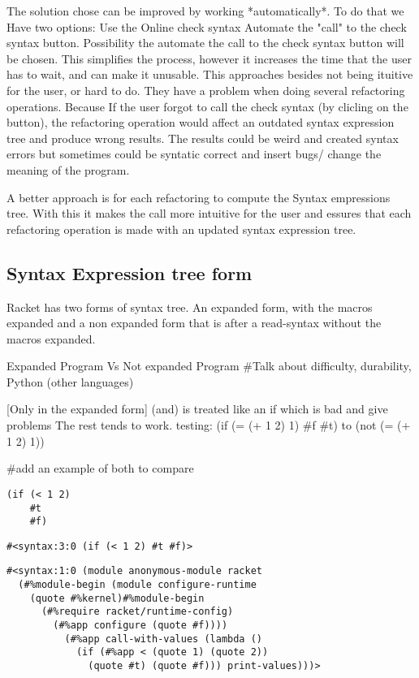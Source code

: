 The solution chose can be improved by working *automatically*.
To do that we Have two options:
 Use the Online check syntax
 Automate the "call" to the check syntax button.
 Possibility the automate the call to the check syntax button will be chosen.
 This simplifies the process, however it increases the time that the user has to
 wait, and can make it unusable.
This approaches besides not being ituitive for the user, or hard to do. They have
a problem when doing several refactoring operations. Because If the user forgot
to call the check syntax (by clicling on the button), the refactoring operation
would affect an outdated syntax expression tree and produce wrong results. The
results could be weird and created syntax errors but sometimes could be syntatic
correct and insert bugs/ change the meaning of the program.

A better approach is for each refactoring to compute the Syntax empressions tree.
With this it makes the call more intuitive for the user and essures that each
refactoring operation is made with an updated syntax expression tree.

\subsection{Syntax Expression tree form}
Racket has two forms of syntax tree. An expanded form, with the macros expanded
and a non expanded form that is after a read-syntax without the macros expanded.

Expanded Program Vs Not expanded Program
\#Talk about difficulty, durability, Python (other languages)

[Only in the expanded form] (and) is treated like an if which is bad and give problems
The rest tends to work.
testing:
(if (= (+ 1 2) 1) \#f \#t) to (not (= (+ 1 2) 1))

\#add an example of both to compare
\begin{lstlisting}[caption="example"]
(if (< 1 2)
    #t
    #f)
\end{lstlisting}

\begin{lstlisting}[caption="Syntax from Example"]
#<syntax:3:0 (if (< 1 2) #t #f)>
\end{lstlisting}

\begin{lstlisting}[caption="Expanded Syntax from example"]
#<syntax:1:0 (module anonymous-module racket
  (#%module-begin (module configure-runtime
    (quote #%kernel)#%module-begin
      (#%require racket/runtime-config)
        (#%app configure (quote #f))))
          (#%app call-with-values (lambda ()
            (if (#%app < (quote 1) (quote 2))
              (quote #t) (quote #f))) print-values)))>
\end{lstlisting}


